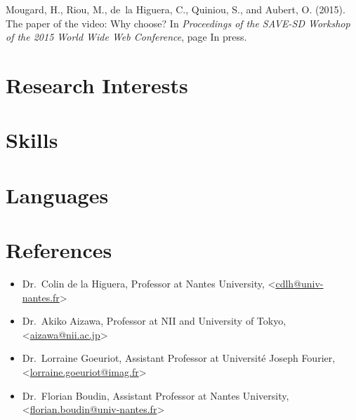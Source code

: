 \documentclass[11pt,a4paper,sans]{moderncv}        %
\begin{document}
\nocite{*}

\begin{thebibliography}{}

Mougard, H., Riou, M., de~la Higuera, C., Quiniou, S., and Aubert, O. (2015).
\newblock The paper of the video: Why choose?
\newblock In {\em Proceedings of the SAVE-SD Workshop of the 2015 World Wide
  Web Conference}, page In press.

\end{thebibliography}

\section{Research Interests}

\section{Skills}


\section{Languages}

\section{References}
\begin{itemize}
\item Dr.~Colin de la Higuera, Professor at Nantes University,
  <\href{mailto:cdlh@univ-nantes.fr}{cdlh@univ-nantes.fr}>
\item Dr.~Akiko Aizawa, Professor at NII and University of Tokyo,
  <\href{mailto:aizawa@nii.ac.jp}{aizawa@nii.ac.jp}>
\item Dr.~Lorraine Goeuriot, Assistant Professor at Université Joseph
  Fourier,
  <\href{mailto:lorraine.goeuriot@imag.fr}{lorraine.goeuriot@imag.fr}>
\item Dr.~Florian Boudin, Assistant Professor at Nantes University,
  <\href{mailto:florian.boudin@univ-nantes.fr}{florian.boudin@univ-nantes.fr}>
\end{itemize}
\end{document}
